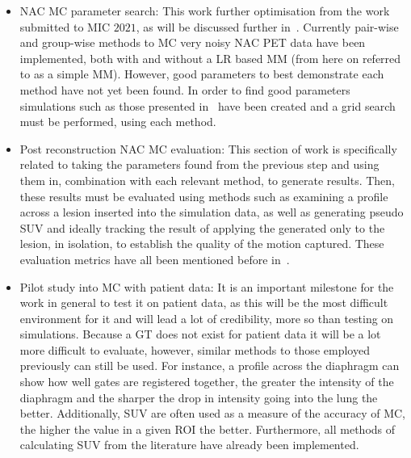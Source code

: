             \begin{itemize}
                \item \gls{NAC} \gls{MC} parameter search: This work further optimisation from the work submitted to MIC $2021$, as will be discussed further in~. Currently pair-wise and group-wise methods to \gls{MC} very noisy \gls{NAC} \gls{PET} data have been implemented, both with and without a \gls{LR} based \gls{MM} (from here on referred to as a simple \gls{MM}). However, good parameters to best demonstrate each method have not yet been found. In order to find good parameters simulations such as those presented in~ have been created and a grid search must be performed, using each method.
    
                \item Post reconstruction \gls{NAC} \gls{MC} evaluation: This section of work is specifically related to taking the parameters found from the previous step and using them in, combination with each relevant method, to generate results. Then, these results must be evaluated using methods such as examining a profile across a lesion inserted into the simulation data, as well as generating pseudo \gls{SUV} and ideally tracking the result of applying the  generated only to the lesion, in isolation, to establish the quality of the motion captured. These evaluation metrics have all been mentioned before in~.
    
                \item Pilot study into \gls{MC} with patient data: It is an important milestone for the work in general to test it on patient data, as this will be the most difficult environment for it and will lead a lot of credibility, more so than testing on simulations. Because a \gls{GT} does not exist for patient data it will be a lot more difficult to evaluate, however, similar methods to those employed previously can still be used. For instance, a profile across the diaphragm can show how well gates are registered together, the greater the intensity of the diaphragm and the sharper the drop in intensity going into the lung the better. Additionally, \gls{SUV} are often used as a measure of the accuracy of \gls{MC}, the higher the value in a given \gls{ROI} the better. Furthermore, all methods of calculating \gls{SUV} from the literature have already been implemented.
    

\end{itemize}
